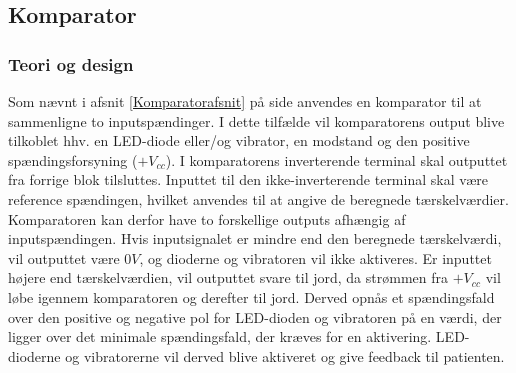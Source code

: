 \subsection{Komparator}
\subsubsection{Teori og design}
Som nævnt i afsnit \ref{Komparatorafsnit} på side \pageref{Komparatorafsnit} anvendes en komparator til at sammenligne to inputspændinger. I dette tilfælde vil komparatorens output blive tilkoblet hhv. en LED-diode eller/og vibrator, en modstand og den positive spændingsforsyning ($+V_{cc}$). I komparatorens inverterende terminal skal outputtet fra forrige blok tilsluttes. Inputtet til den ikke-inverterende terminal skal være reference spændingen, hvilket anvendes til at angive de beregnede tærskelværdier. Komparatoren kan derfor have to forskellige outputs afhængig af inputspændingen. Hvis inputsignalet er mindre end den beregnede tærskelværdi, vil outputtet være $0V$, og dioderne og vibratoren vil ikke aktiveres. Er inputtet højere end tærskelværdien, vil outputtet svare til jord, da strømmen fra $+V_{cc}$ vil løbe igennem komparatoren og derefter til jord. Derved opnås et spændingsfald over den positive og negative pol for LED-dioden og vibratoren på en værdi, der ligger over det minimale spændingsfald, der kræves for en aktivering. LED-dioderne og vibratorerne vil derved blive aktiveret og give feedback til patienten. \\

